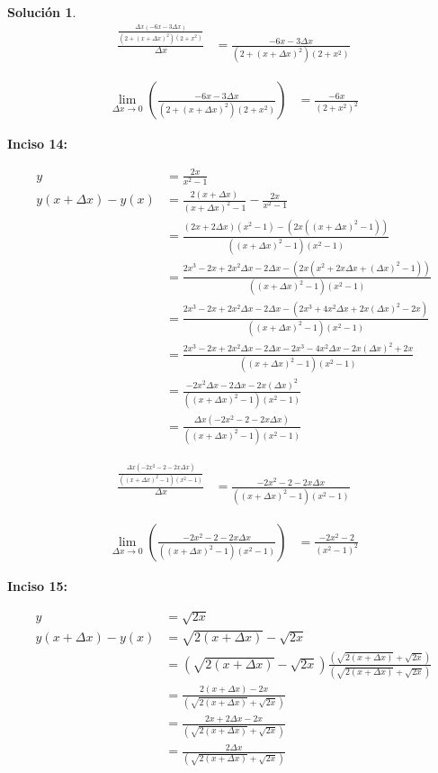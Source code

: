 \documentclass{article}
\theoremstyle{definition}
\newtheorem*{solution}{Solución}
\begin{document}
\begin{solution}
    \begin{align*}
        \frac{\frac{\Delta x(-6x-3\Delta x)}{(2+(x+\Delta x)^2)(2+x^2)}}{\Delta x} &= \frac{-6x-3\Delta x}{(2+(x+\Delta x)^2)(2+x^2)}    
    \end{align*}

    \begin{align*}
        \lim_{\Delta x \to 0} (\frac{-6x-3\Delta x}{(2+(x+\Delta x)^2)(2+x^2)}) &= \frac{-6x}{(2+x^2)^2} 
    \end{align*} 

\textbf{Inciso 14:}

    \begin{align*}
        y &= \frac{2x}{x^2-1} \\
        y(x+\Delta x) - y(x) &= \frac{2(x+\Delta x)}{(x+\Delta x)^2-1} - \frac{2x}{x^2-1} \\
        &= \frac{(2x+2\Delta x)(x^2-1)-(2x((x+\Delta x)^2-1))}{((x+\Delta x)^2-1)(x^2-1)} \\
        &= \frac{2x^3-2x+2x^2\Delta x-2\Delta x-(2x(x^2+2x\Delta x+(\Delta x)^2-1))}{((x+\Delta x)^2-1)(x^2-1)} \\
        &= \frac{2x^3-2x+2x^2\Delta x-2\Delta x-(2x^3+4x^2\Delta x+2x(\Delta x)^2-2x)}{((x+\Delta x)^2-1)(x^2-1)} \\
        &= \frac{2x^3-2x+2x^2\Delta x-2\Delta x-2x^3-4x^2\Delta x-2x(\Delta x)^2+2x}{((x+\Delta x)^2-1)(x^2-1)} \\
        &= \frac{-2x^2\Delta x-2\Delta x-2x(\Delta x)^2}{((x+\Delta x)^2-1)(x^2-1)} \\
        &= \frac{\Delta x(-2x^2-2-2x\Delta x)}{((x+\Delta x)^2-1)(x^2-1)} 
    \end{align*}

    \begin{align*}
        \frac{\frac{\Delta x(-2x^2-2-2x\Delta x)}{((x+\Delta x)^2-1)(x^2-1)}}{\Delta x} &= \frac{-2x^2-2-2x\Delta x}{((x+\Delta x)^2-1)(x^2-1)}    
    \end{align*}

    \begin{align*}
        \lim_{\Delta x \to 0} (\frac{-2x^2-2-2x\Delta x}{((x+\Delta x)^2-1)(x^2-1)}) &= \frac{-2x^2-2}{(x^2-1)^2} 
    \end{align*} 

\textbf{Inciso 15:}

    \begin{align*}
        y &= \sqrt{2x} \\
        y(x+\Delta x) - y(x) &= \sqrt{2(x+\Delta x)} - \sqrt{2x} \\
        &= (\sqrt{2(x+\Delta x)} - \sqrt{2x}) \frac{(\sqrt{2(x+\Delta x)} + \sqrt{2x})}{(\sqrt{2(x+\Delta x)} + \sqrt{2x})} \\
        &= \frac{2(x+\Delta x) - 2x }{(\sqrt{2(x+\Delta x)} + \sqrt{2x})}\\
        &= \frac{2x+2\Delta x-2x}{(\sqrt{2(x+\Delta x)} + \sqrt{2x})} \\
        &= \frac{2\Delta x}{(\sqrt{2(x+\Delta x)} + \sqrt{2x})}
    \end{align*}


\end{solution}
\end{document}
